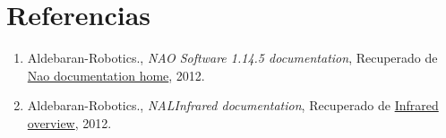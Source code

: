 \documentclass[letterpaper]{article}
\begin{document}
\section{Referencias}

\begin{enumerate}
\item Aldebaran-Robotics., \textit{NAO Software 1.14.5 documentation}, Recuperado de \href{https://community.aldebaran-robotics.com/doc/1-14/index.html#}{Nao documentation home}, 2012.
\item Aldebaran-Robotics., \textit{NALInfrared documentation}, Recuperado de \href{http://doc.aldebaran.com/1-14/naoqi/sensors/alinfrared.html#alinfrared}{Infrared overview}, 2012.
\end{enumerate}
	
\end{document}
